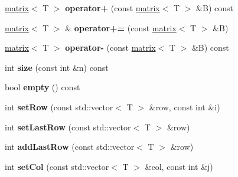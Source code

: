 \begin{DoxyCompactItemize}
\item 
\hypertarget{classkeycpp_1_1matrix_a8c0520cf5064379afa5128cf7f660832}{\hyperlink{classkeycpp_1_1matrix}{matrix}$<$ T $>$ {\bfseries operator+} (const \hyperlink{classkeycpp_1_1matrix}{matrix}$<$ T $>$ \&B) const }\label{classkeycpp_1_1matrix_a8c0520cf5064379afa5128cf7f660832}

\item 
\hypertarget{classkeycpp_1_1matrix_a78655e73267b48e16909a68291f4c074}{\hyperlink{classkeycpp_1_1matrix}{matrix}$<$ T $>$ \& {\bfseries operator+=} (const \hyperlink{classkeycpp_1_1matrix}{matrix}$<$ T $>$ \&B)}\label{classkeycpp_1_1matrix_a78655e73267b48e16909a68291f4c074}

\item 
\hypertarget{classkeycpp_1_1matrix_a1c6cb00f8859e6486a7054f11b1c7e6a}{\hyperlink{classkeycpp_1_1matrix}{matrix}$<$ T $>$ {\bfseries operator-\/} (const \hyperlink{classkeycpp_1_1matrix}{matrix}$<$ T $>$ \&B) const }\label{classkeycpp_1_1matrix_a1c6cb00f8859e6486a7054f11b1c7e6a}

\item 
\hypertarget{classkeycpp_1_1matrix_a32a13ebb69fb5f06dd8923d942d865b4}{int {\bfseries size} (const int \&n) const }\label{classkeycpp_1_1matrix_a32a13ebb69fb5f06dd8923d942d865b4}

\item 
\hypertarget{classkeycpp_1_1matrix_ad522f701e86eafc344d8904d4f0a8f19}{bool {\bfseries empty} () const }\label{classkeycpp_1_1matrix_ad522f701e86eafc344d8904d4f0a8f19}

\item 
\hypertarget{classkeycpp_1_1matrix_a4b28c8f7b6e3d32aab1416faa9316e11}{int {\bfseries set\-Row} (const std\-::vector$<$ T $>$ \&row, const int \&i)}\label{classkeycpp_1_1matrix_a4b28c8f7b6e3d32aab1416faa9316e11}

\item 
\hypertarget{classkeycpp_1_1matrix_ac7675f496771e688a1c059b58ac975cb}{int {\bfseries set\-Last\-Row} (const std\-::vector$<$ T $>$ \&row)}\label{classkeycpp_1_1matrix_ac7675f496771e688a1c059b58ac975cb}

\item 
\hypertarget{classkeycpp_1_1matrix_aa6903fc828a5b42f7c1d9485832601aa}{int {\bfseries add\-Last\-Row} (const std\-::vector$<$ T $>$ \&row)}\label{classkeycpp_1_1matrix_aa6903fc828a5b42f7c1d9485832601aa}

\item 
\hypertarget{classkeycpp_1_1matrix_adf4d81176c098ead33c56d84421b14f5}{int {\bfseries set\-Col} (const std\-::vector$<$ T $>$ \&col, const int \&j)}\label{classkeycpp_1_1matrix_adf4d81176c098ead33c56d84421b14f5}


\end{DoxyCompactItemize}
